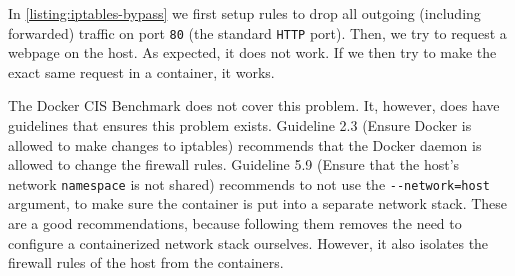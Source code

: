 In \autoref{listing:iptables-bypass} we first setup rules to drop all outgoing (including forwarded) traffic on port \lstinline{80} (the standard \lstinline{HTTP} port). Then, we try to request a webpage on the host. As expected, it does not work. If we then try to make the exact same request in a container, it works.

\medskip

The Docker CIS Benchmark does not cover this problem. It, however, does have guidelines that ensures this problem exists. Guideline 2.3 (Ensure Docker is allowed to make changes to iptables) recommends that the Docker daemon is allowed to change the firewall rules. Guideline 5.9 (Ensure that the host's network \lstinline{namespace} is not shared) recommends to not use the \lstinline{--network=host} argument, to make sure the container is put into a separate network stack. These are a good recommendations, because following them removes the need to configure a containerized network stack ourselves. However, it also isolates the firewall rules of the host from the containers.
